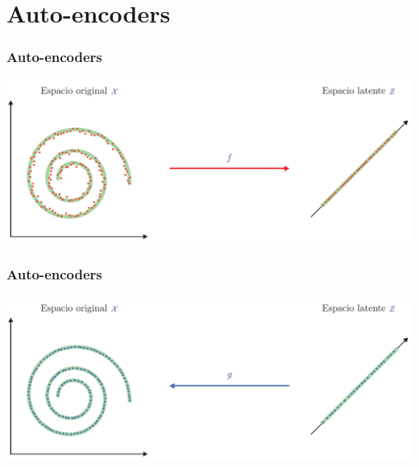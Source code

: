 \documentclass[aspectratio=169]{beamer}
\begin{document}
\section{Auto-encoders}




\begin{frame}[c]
  \frametitle{Auto-encoders}
  \includegraphics[width=.9\textwidth, center]{imgs/tema4/aenc/enc_d.pdf}\\
\end{frame}


\begin{frame}[c]
  \frametitle{Auto-encoders}
  \includegraphics[width=.9\textwidth, center]{imgs/tema4/aenc/dec_b.pdf}\\
\end{frame}
\end{document}
